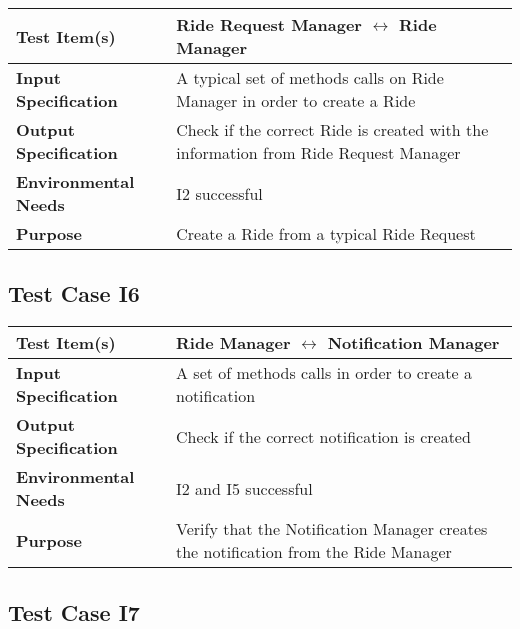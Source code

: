        	\begin{tabular}{p{} p{}}
       		\hline
       		\textbf{Test Item(s)} & Ride Request Manager $ \longleftrightarrow $ Ride Manager \\
       		\hline
       		\textbf{Input Specification} & A typical set of methods calls on Ride Manager in order to create a Ride\\
       		\hline
       		\textbf{Output Specification} & Check if the correct Ride is created with the information from Ride Request Manager\\
       		\hline
       		\textbf{Environmental Needs} &  I2 successful\\
       		\hline
       		\textbf{Purpose} & Create a Ride from a typical Ride Request \\
       		\hline
       	\end{tabular}
       
       
        \subsection{Test Case I6}
        
        	\begin{tabular}{p{} p{}}
        		\hline
        		\textbf{Test Item(s)} & Ride Manager $ \longleftrightarrow $ Notification Manager  \\
        		\hline
        		\textbf{Input Specification} & A set of methods calls in order to create a notification\\
        		\hline
        		\textbf{Output Specification} & Check if the correct notification is created\\
        		\hline
        		\textbf{Environmental Needs} &  I2 and I5 successful\\
        		\hline
        		\textbf{Purpose} & Verify that the Notification Manager creates the notification from the Ride Manager \\
        		\hline
        	\end{tabular}
        
       
 \newpage
        
         \subsection{Test Case I7}
         
